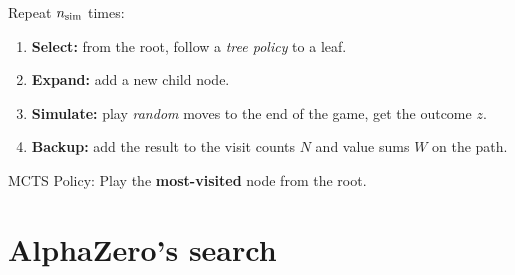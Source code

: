 \begin{frame}
\begin{center}
    \end{center}
    \vspace{-0.2cm}
    \small
    Repeat $n_{\text{sim}}$ times:
    \begin{enumerate}
        \item \textbf{Select:} from the root, follow a \textit{tree policy} to a leaf.
        \item \textbf{Expand:} add a new child node.
        \item \textbf{Simulate:} play \textit{random} moves to the end of the game, get the outcome $z$.
        \item \textbf{Backup:} add the result to the visit counts $N$ and value sums $W$ on the path.
    \end{enumerate}
    MCTS Policy: Play the \textbf{most-visited} node from the root.
\end{frame}

\section{AlphaZero's search}

